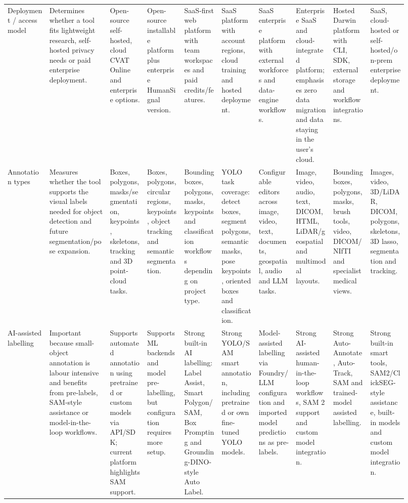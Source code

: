 \begin{landscape}
\begin{longtable}{@{}Y{0.09\linewidth}Y{0.13\linewidth}Y{0.087\linewidth}Y{0.087\linewidth}Y{0.087\linewidth}Y{0.087\linewidth}Y{0.087\linewidth}Y{0.087\linewidth}Y{0.087\linewidth}Y{0.087\linewidth}@{}}
Deployment / access model &
Determines whether a tool fits lightweight research, self-hosted privacy needs or paid enterprise deployment. &
Open-source self-hosted, cloud CVAT Online and enterprise options. &
Open-source installable platform plus enterprise HumanSignal version. &
SaaS-first web platform with team workspaces and paid credits/features. &
SaaS platform with account regions, cloud training and hosted deployment. &
SaaS enterprise platform with external workforces and data-engine workflows. &
Enterprise SaaS and cloud-integrated platform; emphasises zero data migration and data staying in the user's cloud. &
Hosted Darwin platform with CLI, SDK, external storage and workflow integrations. &
SaaS, cloud-hosted or self-hosted/on-prem enterprise deployment. \\

Annotation types &
Measures whether the tool supports the visual labels needed for object detection and future segmentation/pose expansion. &
Boxes, polygons, masks/segmentation, keypoints, skeletons, tracking and 3D point-cloud tasks. &
Boxes, polygons, circular regions, keypoints, object tracking and semantic segmentation. &
Bounding boxes, polygons, masks, keypoints and classification workflows depending on project type. &
YOLO task coverage: detect boxes, segment polygons, semantic masks, pose keypoints, oriented boxes and classification. &
Configurable editors across image, video, text, documents, geospatial, audio and LLM tasks. &
Image, video, audio, text, DICOM, HTML, LiDAR/geospatial and multimodal layouts. &
Bounding boxes, polygons, masks, brush tools, video, DICOM/NIfTI and specialist medical views. &
Images, video, 3D/LiDAR, DICOM, polygons, skeletons, 3D lasso, segmentation and tracking. \\

AI-assisted labelling &
Important because small-object annotation is labour intensive and benefits from pre-labels, SAM-style assistance or model-in-the-loop workflows. &
Supports automated annotation using pretrained or custom models via API/SDK; current platform highlights SAM support. &
Supports ML backends and model pre-labelling, but configuration requires more setup. &
Strong built-in AI labelling: Label Assist, Smart Polygon/SAM, Box Prompting and Grounding-DINO-style Auto Label. &
Strong YOLO/SAM smart annotation, including pretrained or own fine-tuned YOLO models. &
Model-assisted labelling via Foundry/LLM configuration and imported model predictions as pre-labels. &
Strong AI-assisted human-in-the-loop workflows, SAM 2 support and custom model integration. &
Strong Auto-Annotate, Auto-Track, SAM and trained-model assisted labelling. &
Strong built-in smart tools, SAM2/ClickSEG-style assistance, built-in models and custom model integration. \\


\end{longtable}
\end{landscape}
